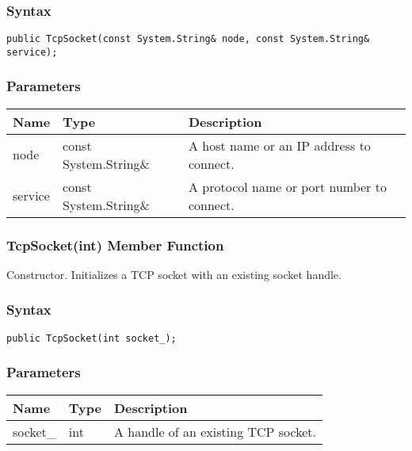 \documentclass[a4paper,oneside,11.000000pt]{book}
\begin{document}
\subsubsection*{Syntax}
\texttt{public TcpSocket(const System.String\& node, const System.String\& service);}
\subsubsection*{Parameters}
\begin{flushleft}
\begin{supertabular}[l]{!{\raggedright}p{1.56801cm}!{\raggedright}p{4.63128cm}!{\raggedright}p{5.23538cm}}
\textbf{Name}
& \textbf{Type}
& \textbf{Description}
\\
\hline
node
& const System.\-String\&\-
& A host name or an IP address to connect.

\\
service
& const System.\-String\&\-
& A protocol name or port number to connect.

\\
\end{supertabular}

\end{flushleft}
\clearpage

\hypertarget{System.Net.Sockets.TcpSocket.constructor.P.System.Net.Sockets.TcpSocket.int}{\subsubsection*{TcpSocket(int) Member Function}}
\begin{flushleft}
Constructor. Initializes a TCP socket with an existing socket handle.

\end{flushleft}
\subsubsection*{Syntax}\texttt{public TcpSocket(int socket\_);}

\subsubsection*{Parameters}
\begin{flushleft}
\begin{supertabular}[l]{lll}
\textbf{Name}
& \textbf{Type}
& \textbf{Description}
\\
\hline
socket\_
& int
& A handle of an existing TCP socket.

\\
\end{supertabular}

\end{flushleft}
\clearpage
\end{document}
